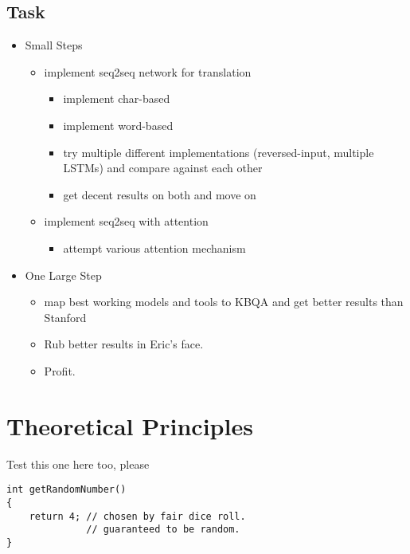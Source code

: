 \documentclass[10pt,a4paper,titlepage,twoside,english]{zhawreprt}
\begin{document}
\section{Task}\label{sec:Task}
\begin{itemize}
\item Small Steps
\begin{itemize}
\item implement seq2seq network for translation
\begin{itemize}
\item implement char-based
\item implement word-based
\item try multiple different implementations (reversed-input, multiple LSTMs) and compare against each other
\item get decent results on both and move on
\end{itemize}
\item implement seq2seq with attention
\begin{itemize}
\item attempt various attention mechanism
\end{itemize}
\end{itemize}
\item One Large Step
\begin{itemize}
\item map best working models and tools to KBQA and get better results than Stanford
\item Rub better results in Eric's face.
\item Profit.
\end{itemize}
\end{itemize}

\chapter{Theoretical Principles}\label{chp:TheoreticalPrinciples}
Test this one here too, please
\setlistingCSharp
\begin{lstlisting}[linebackgroundcolor={\inlist{lstnumber}{3,4}}]
int getRandomNumber()
{
	return 4; // chosen by fair dice roll.
			  // guaranteed to be random.
}
\end{lstlisting}
\end{document}
